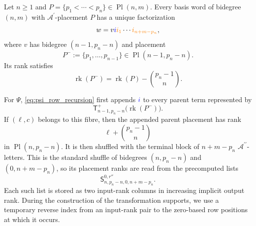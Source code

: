 \documentclass{amsart}
\theoremstyle{definition}
\theoremstyle{remark}
\newcommand{\blue}[1]{{\color{blue}#1}}
\newcommand{\orange}[1]{{\color{orange}#1}}
\begin{document}
Let $n\geq1$ and
$P=\{p_1<\cdots<p_n\}\in\operatorname{Pl}(n,m)$. Every basis word of
bidegree $(n,m)$ with $\mathcal{A}^{\prime}$-placement $P$ has a unique
factorization
\[
    w
    =
    v\blue{i}
    \orange{i_1}\cdots\orange{i_{n+m-p_n}},
\]
where $v$ has bidegree $(n-1,p_n-n)$ and placement
\[
    P^{-}
    :=
    \{p_1,\ldots,p_{n-1}\}
    \in
    \operatorname{Pl}(n-1,p_n-n).
\]
Its rank satisfies
\[
    \operatorname{rk}(P^{-})
    =
    \operatorname{rk}(P)-\binom{p_n-1}{n}.
\]

For $\Psi$, \eqref{eq:psi_row_recursion} first appends
$\blue{i}$ to every parent term represented by
\[
    \mathsf{T}^{+}_{n-1,p_n-n}
    \bigl(
        \operatorname{rk}(P^{-})
    \bigr).
\]
If $(\ell,c)$ belongs to this fibre, then the appended parent placement has
rank
\[
    \ell+\binom{p_n-1}{n}
\]
in $\operatorname{Pl}(n,p_n-n)$. It is then shuffled with the terminal
block of $n+m-p_n$ $\mathcal{A}^{\prime\prime}$-letters. This is the
standard shuffle of bidegrees
$(n,p_n-n)$ and $(0,n+m-p_n)$, so its placement ranks are read from the
precomputed lists
\[
    \mathsf{S}^{0,r''}_{n,p_n-n,0,n+m-p_n}.
\]
Each such list is stored as two input-rank columns in increasing implicit
output rank. During the construction of the transformation supports, we
use a temporary reverse index from an input-rank pair to the zero-based row
positions at which it occurs.
\end{document}

